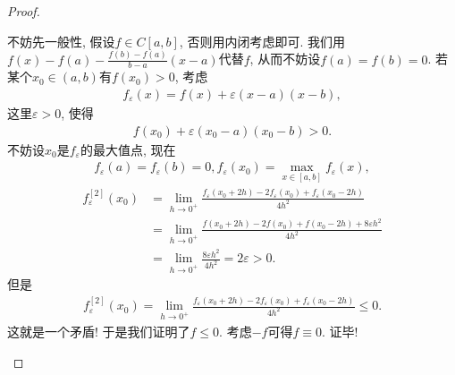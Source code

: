 \documentclass[../../main.tex]{subfiles}%
\begin{document}
\begin{proof}
\begin{enumerate}
不妨先一般性, 假设$f \in C[a,b]$, 否则用内闭考虑即可. 
我们用$f(x) - f(a) - \frac{f(b) - f(a)}{b - a}(x - a)$代替$f$, 从而不妨设$f(a) = f(b) = 0$. 若某个$x_0 \in (a,b)$有$f(x_0) > 0$, 考虑
\begin{align*}
f_\varepsilon(x) = f(x) + \varepsilon(x - a)(x - b),
\end{align*}
这里$\varepsilon > 0$, 使得
\begin{align*}
f(x_0) + \varepsilon(x_0 - a)(x_0 - b) > 0.
\end{align*}
不妨设$x_0$是$f_\varepsilon$的最大值点, 现在
\begin{gather*}
f_\varepsilon(a) = f_\varepsilon(b) = 0, f_\varepsilon(x_0) = \max_{x \in [a,b]} f_\varepsilon(x),
\end{gather*}
\begin{align*}
f_{\varepsilon}^{[2]}(x_0)&=\lim_{h\rightarrow 0^+} \frac{f_{\varepsilon}(x_0+2h)-2f_{\varepsilon}(x_0)+f_{\varepsilon}(x_0-2h)}{4h^2}
\\
&=\lim_{h\rightarrow 0^+} \frac{f(x_0+2h)-2f(x_0)+f(x_0-2h)+8\varepsilon h^2}{4h^2}
\\
&=\lim_{h\rightarrow 0^+} \frac{8\varepsilon h^2}{4h^2}=2\varepsilon >0.
\end{align*}
但是
\begin{align*}
f_\varepsilon^{[2]}(x_0) = \lim_{h \to 0^+} \frac{f_\varepsilon(x_0 + 2h) - 2f_\varepsilon(x_0) + f_\varepsilon(x_0 - 2h)}{4h^2} \leqslant 0.
\end{align*}
这就是一个矛盾! 于是我们证明了$f \leqslant 0$. 考虑$-f$可得$f \equiv 0$. 证毕!
\end{enumerate}

\end{proof}
\end{document}
